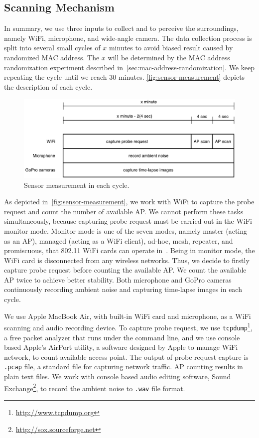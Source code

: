 \subsection{Scanning Mechanism} %
\label{sub:scanning}
In summary, we use three inputs to collect and to perceive the surroundings, namely WiFi, microphone, and wide-angle camera. The data collection process is split into several small cycles of $x$ minutes to avoid biased result caused by randomized \ac{MAC} address. The $x$ will be determined by the \ac{MAC} address randomization experiment described in~\autoref{sec:mac-address-randomization}. We keep repeating the cycle until we reach 30 minutes. \autoref{fig:sensor-measurement} depicts the description of each cycle.

\begin{figure}[ht]
	\centering
	\includegraphics[width=\textwidth]{./img/3-scanning-mechanism}
	\caption{Sensor measurement in each cycle.}
	\label{fig:sensor-measurement}
\end{figure}

As depicted in~\autoref{fig:sensor-measurement}, we work with WiFi to capture the probe request and count the number of available \ac{AP}. We cannot perform these tasks simultaneously, because capturing probe request must be carried out in the WiFi monitor mode. Monitor mode is one of the seven modes, namely master (acting as an \ac{AP}), managed (acting as a WiFi client), ad-hoc, mesh, repeater, and promiscuous, that 802.11 WiFi cards can operate in~\cite{thesis082}. Being in monitor mode, the WiFi card is disconnected from any wireless networks. Thus, we decide to firstly capture probe request before counting the available \ac{AP}. We count the available \ac{AP} twice to achieve better stability. Both microphone and GoPro cameras continuously recording ambient noise and capturing time-lapse images in each cycle.

We use Apple MacBook Air, with built-in WiFi card and microphone, as a WiFi scanning and audio recording device. To capture probe request, we use \verb|tcpdump|\footnote{\url{http://www.tcpdump.org}}, a free packet analyzer that runs under the command line, and we use console based Apple's AirPort utility, a software designed by Apple to manage WiFi network, to count available access point. The output of probe request capture is \verb|.pcap| file, a standard file for capturing network traffic. \ac{AP} counting results in plain text files. We work with console based audio editing software, Sound Exchange\footnote{\url{http://sox.sourceforge.net}}, to record the ambient noise to \verb|.wav| file format.

